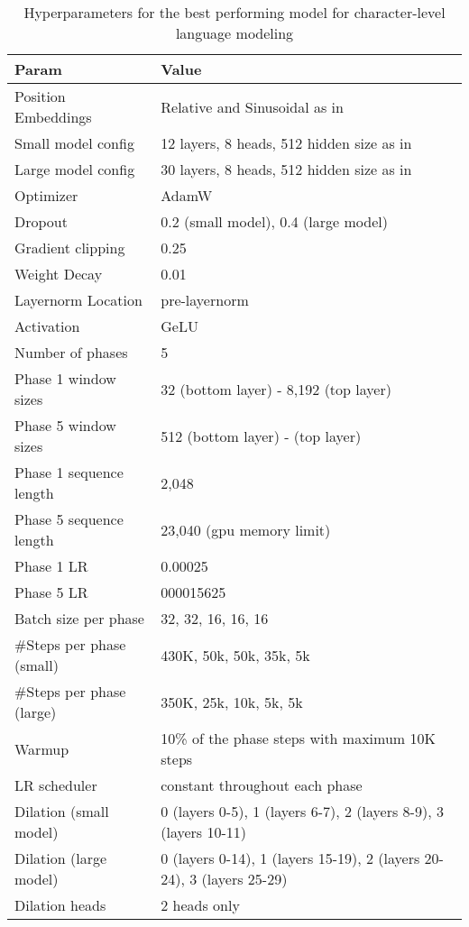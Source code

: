 \documentclass[11pt,a4paper]{article}
\begin{document}
\begin{table*}
 \centering
 \small
\begin{tabular}{@{}ll@{}}
\toprule
Param & Value \\
\midrule
Position Embeddings & Relative and Sinusoidal as in~\citet{transformerxl} \\
Small model config & 12 layers, 8 heads, 512 hidden size as in~\citet{transformerxl} \\
Large model config & 30 layers, 8 heads, 512 hidden size as in~\citet{sparseOpenai} \\
Optimizer & AdamW \\
Dropout & 0.2 (small model), 0.4  (large model) \\
Gradient clipping & 0.25 \\
Weight Decay & 0.01 \\
Layernorm Location & pre-layernorm~\cite{layernorm} \\
Activation & GeLU \\
Number of phases & 5 \\
Phase 1 window sizes & 32 (bottom layer) - 8,192 (top layer) \\
Phase 5 window sizes & 512 (bottom layer) -  (top layer) \\
Phase 1 sequence length & 2,048 \\
Phase 5 sequence length & 23,040  (gpu memory limit) \\
Phase 1 LR & 0.00025 \\
Phase 5 LR & 000015625 \\
Batch size per phase & 32, 32, 16, 16, 16 \\
\#Steps per phase (small) & 430K, 50k, 50k, 35k, 5k \\
\#Steps per phase (large) & 350K, 25k, 10k, 5k, 5k \\
Warmup & 10\% of the phase steps with maximum 10K steps \\
LR scheduler & constant throughout each phase \\
Dilation (small model) & 0 (layers 0-5), 1 (layers 6-7), 2 (layers 8-9), 3 (layers 10-11) \\
Dilation (large model) & 0 (layers 0-14), 1 (layers 15-19), 2 (layers 20-24), 3 (layers 25-29) \\
Dilation heads & 2 heads only \\
\bottomrule
\end{tabular}
\caption{Hyperparameters for the best performing model for character-level language modeling}
\label{tab:char-hyperparams}
 \end{table*}
\end{document}
